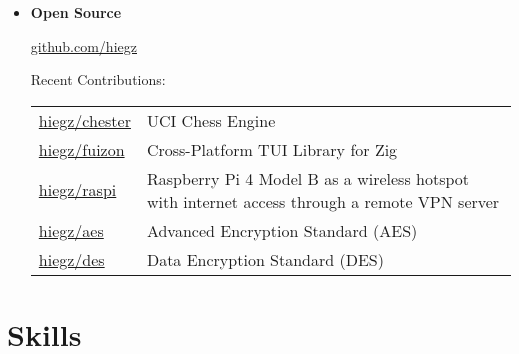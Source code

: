 \documentclass[]{article}
\begin{document}
\begin{itemize}[leftmargin=0.15in, rightmargin=0.15in, label={}]
    \item {\large\bfseries Open Source}

        \:\: { \href{https://github.com/hiegz}{\ttfamily \underline{github.com/hiegz}}}

        \vspace{7pt}
        \hspace{5pt}
        Recent Contributions:

        \hspace{20pt}
        \begin{tabular}{@{}lp{8cm}}
            \href{https://github.com/hiegz/chester}{\ttfamily hiegz/chester} & UCI Chess Engine \\[3pt]
            \href{https://github.com/hiegz/fuizon}{\ttfamily hiegz/fuizon}   & Cross-Platform TUI Library for Zig \\[3pt]
            \href{https://github.com/hiegz/raspi}{\ttfamily hiegz/raspi}     & Raspberry Pi 4 Model B as a wireless hotspot with internet access through a remote VPN server \\[3pt]
            \href{https://github.com/hiegz/aes}{\ttfamily hiegz/aes}         & Advanced Encryption Standard (AES) \\[3pt]
            \href{https://github.com/hiegz/des}{\ttfamily hiegz/des}         & Data Encryption Standard (DES)
        \end{tabular}
\end{itemize}

\section{Skills}
\end{document}
